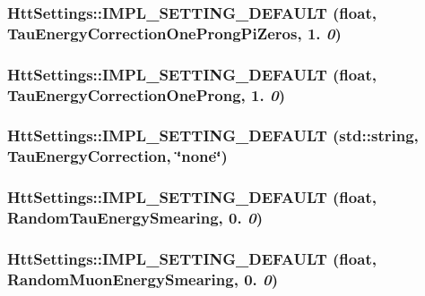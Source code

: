 \hypertarget{classHttSettings_a990bb76f25ef953b323a1da97df0a42f}{
\subsubsection[{IMPL\_\-SETTING\_\-DEFAULT}]{\setlength{\rightskip}{0pt plus 5cm}HttSettings::IMPL\_\-SETTING\_\-DEFAULT (float, \/  TauEnergyCorrectionOneProngPiZeros, \/  1. {\em 0})}}
\label{classHttSettings_a990bb76f25ef953b323a1da97df0a42f}
\hypertarget{classHttSettings_ae87028c834eae8a541ffa7adb6945f6a}{
\subsubsection[{IMPL\_\-SETTING\_\-DEFAULT}]{\setlength{\rightskip}{0pt plus 5cm}HttSettings::IMPL\_\-SETTING\_\-DEFAULT (float, \/  TauEnergyCorrectionOneProng, \/  1. {\em 0})}}
\label{classHttSettings_ae87028c834eae8a541ffa7adb6945f6a}
\hypertarget{classHttSettings_a26b4399da3b83c9a2c2174aad667cb69}{
\subsubsection[{IMPL\_\-SETTING\_\-DEFAULT}]{\setlength{\rightskip}{0pt plus 5cm}HttSettings::IMPL\_\-SETTING\_\-DEFAULT (std::string, \/  TauEnergyCorrection, \/  \char`\"{}none\char`\"{})}}
\label{classHttSettings_a26b4399da3b83c9a2c2174aad667cb69}
\hypertarget{classHttSettings_a7e16a0445696e88db976f5b6ec6e2cff}{
\subsubsection[{IMPL\_\-SETTING\_\-DEFAULT}]{\setlength{\rightskip}{0pt plus 5cm}HttSettings::IMPL\_\-SETTING\_\-DEFAULT (float, \/  RandomTauEnergySmearing, \/  0. {\em 0})}}
\label{classHttSettings_a7e16a0445696e88db976f5b6ec6e2cff}
\hypertarget{classHttSettings_a678dfd913c2204cc5d642301a43756fa}{
\subsubsection[{IMPL\_\-SETTING\_\-DEFAULT}]{\setlength{\rightskip}{0pt plus 5cm}HttSettings::IMPL\_\-SETTING\_\-DEFAULT (float, \/  RandomMuonEnergySmearing, \/  0. {\em 0})}}
